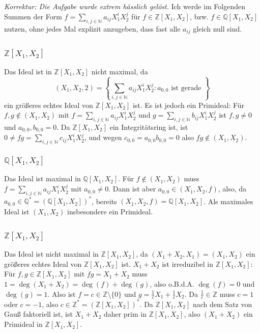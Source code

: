 \documentclass[a4paper,10pt]{article}
\theoremstyle{definition}
\newcommand{\N}{\mathbb{N}}
\newcommand{\Z}{\mathbb{Z}}
\newcommand{\Q}{\mathbb{Q}}
\begin{document}
\section{}
\emph{Korrektur: Die Aufgabe wurde extrem hässlich gelöst.}
Ich werde im Folgenden Summen der Form $f = \sum_{i,j \in \N} a_{ij} X_1^i X_2^j$ für $f \in \Z[X_1, X_2]$, bzw. $f \in \Q[X_1, X_2]$ nutzen, ohne jedes Mal explizit anzugeben, dass fast alle $a_{ij}$ gleich null sind.


\subsection{}

\subsubsection{$\Z[X_1, X_2]$}
Das Ideal ist in $\Z[X_1, X_2]$ nicht maximal, da
\[
 (X_1, X_2, 2) = \left\{\sum_{i,j \in \N} a_{ij} X_1^i X_2^j : a_{0,0} \text{ ist gerade }\right\}
\]
ein größeres echtes Ideal von $\Z[X_1, X_2]$ ist. Es ist jedoch ein Primideal: Für $f,g \not\in (X_1, X_2)$ mit $f = \sum_{i,j \in \N} a_{ij} X^i_1 X^j_2$ und $g = \sum_{i,j \in \N} b_{ij} X^i_1 X^j_2$ ist $f,g \neq 0$ und $a_{0,0}, b_{0,0} = 0$. Da $\Z[X_1, X_2]$ ein Integritätsring ist, ist $0 \neq fg = \sum_{i,j \in \N} c_{ij} X^i_1 X^j_2$, und wegen $c_{0,0} = a_{0,0} b_{0,0} = 0$ also $fg \not\in (X_1, X_2)$.

\subsubsection{$\Q[X_1, X_2]$}
Das Ideal ist maximal in $\Q[X_1, X_2]$. Für $f \not\in (X_1, X_2)$ muss $f=\sum_{i,j \in \N} a_{ij} X^i_1 X^j_2$ mit $a_{0,0} \neq 0$. Dann ist aber $a_{0,0} \in (X_1, X_2, f)$, also, da $a_{0,0} \in \Q^* = (\Q[X_1, X_2])^*$, bereits $(X_1, X_2, f) = \Q[X_1, X_2]$. Als maximales Ideal ist $(X_1, X_2)$ insbesondere ein Primideal.


\subsection{}

\subsubsection{$\Z[X_1, X_2]$}
Das Ideal ist nicht maximal in $\Z[X_1, X_2]$, da $(X_1+X_2, X_1) = (X_1, X_2)$ ein größeres echtes Ideal von $\Z[X_1, X_2]$ ist. $X_1+X_2$ ist irreduzibel in $\Z[X_1, X_2]$: Für $f,g \in \Z[X_1, X_2]$ mit $fg = X_1 + X_2$ muss $1 = \deg(X_1 + X_2) = \deg(f) + \deg(g)$, also o.B.d.A. $\deg(f) = 0$ und $\deg(g) = 1$. Also ist $f = c \in \Z\setminus\{0\}$ und $g = \frac{1}{c}X_1 + \frac{1}{c}X_2$. Da $\frac{1}{c} \in \Z$ muss $c=1$ oder $c=-1$, also $c \in \Z^* = (\Z[X_1, X_2])^*$. Da $\Z[X_1, X_2]$ nach dem Satz von Gauß faktoriell ist, ist $X_1+X_2$ daher prim in $\Z[X_1, X_2]$, also $(X_1+X_2)$ ein Primideal in $\Z[X_1, X_2]$.
\end{document}
